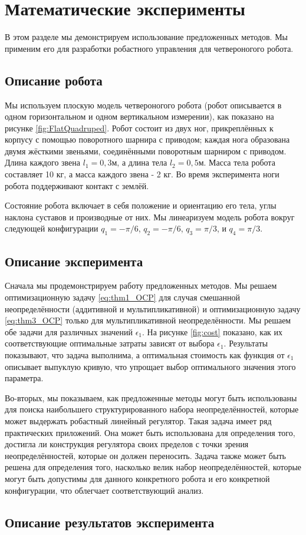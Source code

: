 \chapter{Математические эксперименты}\label{ch:ch4}
В этом разделе мы демонстрируем использование предложенных методов. Мы применим его для разработки робастного управления для четвероногого робота. 
\section{Описание робота}\label{sec:ch4/sect1}
Мы используем плоскую модель четвероногого робота (робот описывается в одном горизонтальном и одном вертикальном измерении), как показано на рисунке \ref{fig:FlatQuadruped}. Робот состоит из двух ног, прикреплённых к корпусу с помощью поворотного шарнира с приводом; каждая нога образована двумя жёсткими звеньями, соединёнными поворотным шарниром с приводом. Длина каждого звена $l_1 = 0,3 м$, а длина тела $l_2 = 0,5 м$. Масса тела робота составляет 10 кг, а масса каждого звена - 2 кг. Во время эксперимента ноги робота поддерживают контакт с землёй.

Состояние робота включает в себя положение и ориентацию его тела, углы наклона суставов и производные от них. Мы линеаризуем модель робота вокруг следующей конфигурации $q_1 =- \pi/6$, $q_2 = -\pi / 6$, $q_3 = \pi / 3$, и $q_4 = \pi / 3$.
\section{Описание эксперимента}\label{sec:ch4/sect2}
Сначала мы продемонстрируем работу предложенных методов. Мы решаем оптимизационную задачу \eqref{eq:thm1_OCP} для случая смешанной неопределённости (аддитивной и мультипликативной) и оптимизационную задачу \eqref{eq:thm3_OCP} только для мультипликативной неопределённости. Мы решаем обе задачи для различных значений $\epsilon_1$. На рисунке \ref{fig:cost} показано, как их соответствующие оптимальные затраты зависят от выбора $\epsilon_1$. Результаты показывают, что задача выполнима, а оптимальная стоимость как функция от $\epsilon_1$ описывает выпуклую кривую, что упрощает выбор оптимального значения этого параметра.

Во-вторых, мы показываем, как предложенные методы могут быть использованы для поиска наибольшего структурированного набора неопределённостей, которые может выдержать робастный линейный регулятор. Такая задача имеет ряд практических приложений. Она может быть использована для определения того, достигла ли конструкция регулятора своих пределов с точки зрения неопределённостей, которые он должен переносить. Задача также может быть решена для определения того, насколько велик набор неопределённостей, которые могут быть допустимы для данного конкретного робота и его конкретной конфигурации, что облегчает соответствующий анализ.
\section{Описание результатов эксперимента}\label{sec:ch4/sect3}